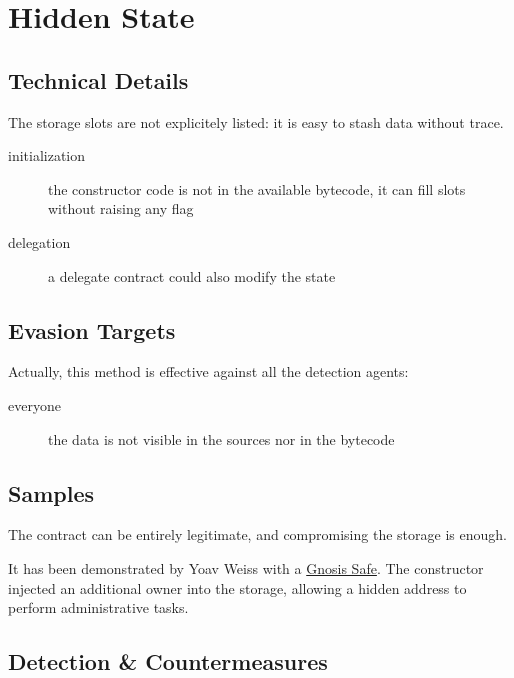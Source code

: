 \section{Hidden State}

\subsection{Technical Details}

The storage slots are not explicitely listed: it is easy to stash data without trace.

\begin{description}
\item[initialization]{the constructor code is not in the available bytecode, it can fill slots without raising any flag}
\item[delegation]{a delegate contract could also modify the state}
\end{description}

\subsection{Evasion Targets}

Actually, this method is effective against all the detection agents:

\begin{description}
\item[everyone]{the data is not visible in the sources nor in the bytecode}
\end{description}

\subsection{Samples}

The contract can be entirely legitimate, and compromising the storage is enough.

It has been demonstrated by Yoav Weiss \cite{video-masquerading-code} with a \href{https://github.com/safe-global/safe-contracts}{Gnosis Safe}.
The constructor injected an additional owner into the storage, allowing a hidden address to perform administrative tasks.

\subsection{Detection \& Countermeasures}

\begin{description}
\item[]{}
\end{description}
